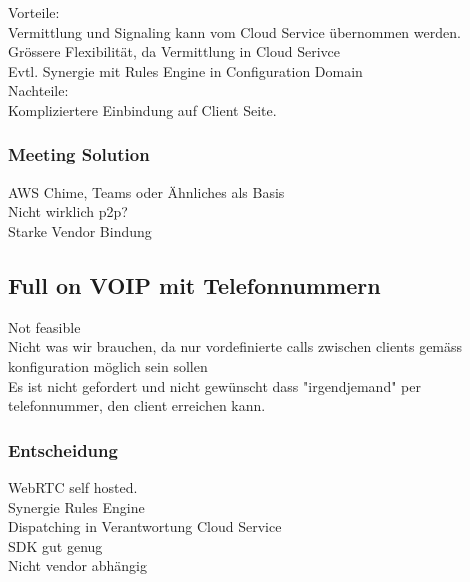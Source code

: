 Vorteile: \\

Vermittlung und Signaling kann vom Cloud Service übernommen werden. \\
Grössere Flexibilität, da Vermittlung in Cloud Serivce \\
Evtl. Synergie mit Rules Engine in Configuration Domain \\

Nachteile: \\

Kompliziertere Einbindung auf Client Seite.


\subsubsection{Meeting Solution}

AWS Chime, Teams oder Ähnliches als Basis \\
Nicht wirklich p2p? \\
Starke Vendor Bindung \\



\subsection{Full on VOIP mit Telefonnummern}

Not feasible \\
Nicht was wir brauchen, da nur vordefinierte calls zwischen clients gemäss konfiguration möglich sein sollen \\
Es ist nicht gefordert und nicht gewünscht dass "irgendjemand" per telefonnummer, den client erreichen kann. \\


\subsubsection{Entscheidung}

WebRTC self hosted. \\

Synergie Rules Engine \\
Dispatching in Verantwortung Cloud Service \\
SDK gut genug \\
Nicht vendor abhängig \\


\clearpage

